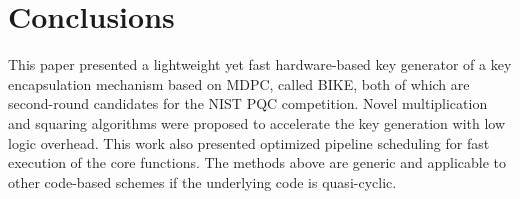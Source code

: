 \documentclass[runningheads]{llncs}
\begin{document}
\section{Conclusions}
This paper presented a lightweight yet fast hardware-based key generator of a key encapsulation mechanism based on MDPC, called BIKE, both of which are second-round candidates for the NIST PQC competition. Novel multiplication and squaring algorithms were proposed to accelerate the key generation with low logic overhead. This work also presented optimized pipeline scheduling for fast execution of the core functions. The methods above are generic and applicable to other code-based schemes if the underlying code is quasi-cyclic.

%
%
%
% 
% 
%


\end{document}
